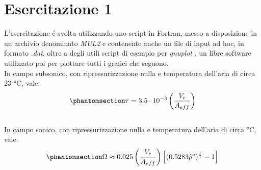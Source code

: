 \documentclass{article}
\begin{document}
    \section{Esercitazione 1\label{Esercitazione_1}}
    L'esercitazione é svolta utilizzando uno script in Fortran, messo a disposizione
    in un archivio denominato \textit{MUL2} \autocite{MUL2} e contenente anche un file di input ad hoc, in formato \textit{.dat},
    oltre a degli utili script di esempio per \textit{gnuplot} \autocite{gnuplot}, un libre software utilizzato poi per plottare tutti i grafici che seguono.
    \\
    \linebreak 
    In campo subsonico, con ripressurizzazione
    nulla e temperatura dell'aria di circa 23 °C, vale:
        \\ 
        \begin{equation}
            \phantomsection
            \label{tau_equation}
            \tau = 3.5 \cdot  10^{-3}\left ( \frac{V_c}{A_{eff}} \right )
        \end{equation}
        \\ 
        In campo sonico, con ripressurizzazione nulla e temperatura
        dell'aria di circa °C, vale:
        \\ 
        \begin{equation}
            \phantomsection
            \label{Omega_equation}
            \Omega \approx 0.025\left ( \frac{V_c}{A_{eff}} \right )\left [ (0.5283{\tilde{p}}^{o})^{\frac{1}{7}} - 1 \right ]
        \end{equation} 
        \\ 
\end{document}
